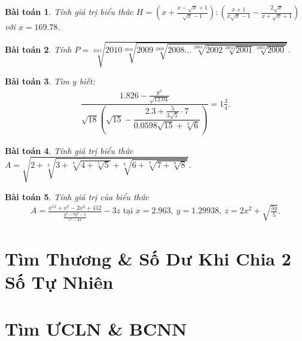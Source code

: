 \documentclass{article}
\newtheorem{baitoan}{Bài toán}
\begin{document}
\begin{baitoan}
	Tính giá trị biểu thức $H = \left(x + \frac{x - \sqrt{x} + 1}{\sqrt{x} - 1}\right):\left(\frac{x + 1}{x\sqrt{x} - 1} - \frac{2\sqrt{x}}{x + \sqrt{x} + 1}\right)$ với $x = 169.78$.
\end{baitoan}

\begin{baitoan}
	Tính $P = \sqrt[2011]{2010\sqrt[2010]{2009\sqrt[2009]{2008\ldots\sqrt[2003]{2002\sqrt[2002]{2001}\sqrt[2001]{2000}}}}}$.
\end{baitoan}

\begin{baitoan}
	Tìm $y$ biết:
	\begin{align*}
		\dfrac{1.826 - \frac{y^2}{\sqrt{12.04}}}{\sqrt{18}\left(\sqrt{15} - \dfrac{2.3 + \frac{5}{3\sqrt{5}}\cdot7}{0.0598\sqrt{15} + \sqrt[3]{6}}\right)} = 1\frac{3}{4}.
	\end{align*}
\end{baitoan}

\begin{baitoan}
	Tính giá trị biểu thức $A = \sqrt{2 + \sqrt[3]{3 + \sqrt[4]{4 + \sqrt[5]{5}} + \sqrt[6]{6 + \sqrt[7]{7 + \sqrt[8]{8}}}}}$.
\end{baitoan}

\begin{baitoan}
	Tính giá trị của biểu thức
	\begin{align*}
		A = \frac{x^{12} + x^7 - 2x^2 + 412}{\frac{y^3 - 7y^9 - 1}{z^3 - 4x}} - 3z\mbox{ tại } x = 2.963,\ y = 1.29938,\ z = 2x^2 + \sqrt{\frac{3y}{5}}.
	\end{align*}
\end{baitoan}


\section{Tìm Thương \& Số Dư Khi Chia 2 Số Tự Nhiên}


\section{Tìm ƯCLN \& BCNN}

\end{document}
